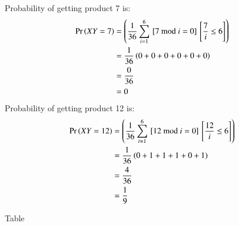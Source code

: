 \documentclass[journal,12pt,onecolumn]{IEEEtran}
\begin{document}
Probability of getting product 7 is:
\begin{align}
    \Pr\left(XY = 7\right) &= \left(\frac{1}{36}\sum_{i = 1}^{6} {}\left[7 \text{ mod } i = 0\right]{}\left[\frac{7}{i} \leq 6\right]\right) \\
    &= \frac{1}{36} \left( 0 + 0 + 0 + 0 + 0 + 0  \right) \\
    &= \frac{0}{36} \\
    &= 0 
\end{align}
Probability of getting product 12 is:
\begin{align}
    \Pr\left(XY = 12\right) &= \left(\frac{1}{36}\sum_{i = 1}^{6} {}\left[12 \text{ mod } i = 0\right]{}\left[\frac{12}{i} \leq 6\right]\right) \\
    &= \frac{1}{36} \left( 0 + 1 + 1 + 1 + 0 + 1  \right) \\
    &= \frac{4}{36} \\
    &= \frac{1}{9} 
\end{align}
\begin{table}[H]
\caption{Table}
\label{tab:ncert/10/13/3/16/}
\centering

\end{table}
\end{document}
